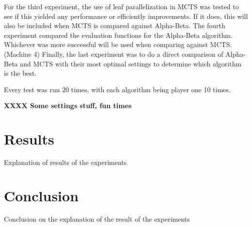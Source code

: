 \documentclass{ba-kecs}
\begin{document}
For the third experiment, the use of leaf parallelization in MCTS was tested to see if this yielded any performance or efficiently improvements. If it does, this will also be included when MCTS is compared against Alpha-Beta. The fourth experiment compared the evaluation functions for the Alpha-Beta algorithm. Whichever was more successful will be used when comparing against MCTS. (Machine 4) Finally, the last experiment was to do a direct comparison of Alpha-Beta and MCTS with their most optimal settings to determine which algorithm is the best.

Every test was run 20 times, with each algorithm being player one 10 times. 

\textbf{ XXXX Some settings stuff, fun times}
\section{Results}
Explanation of results of the experiments
\section{Conclusion}
Conclusion on the explanation of the result of the experiments


\end{document}
